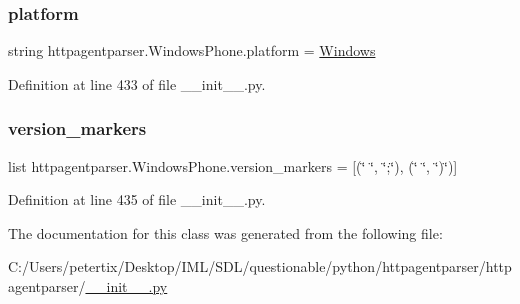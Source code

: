 \hypertarget{classhttpagentparser_1_1_windows_phone_a15ed99a57eb909ace7f81f20d6657c80}{}\label{classhttpagentparser_1_1_windows_phone_a15ed99a57eb909ace7f81f20d6657c80} 
\subsubsection{\texorpdfstring{platform}{platform}}
{\footnotesize\ttfamily string httpagentparser.\+Windows\+Phone.\+platform = \textquotesingle{}\hyperlink{classhttpagentparser_1_1_windows}{Windows}\textquotesingle{}\hspace{0.3cm}{\ttfamily [static]}}



Definition at line 433 of file \+\_\+\+\_\+init\+\_\+\+\_\+.\+py.

\hypertarget{classhttpagentparser_1_1_windows_phone_a831e0bf92f4204a06c41bac10f5269df}{}\label{classhttpagentparser_1_1_windows_phone_a831e0bf92f4204a06c41bac10f5269df} 
\subsubsection{\texorpdfstring{version\+\_\+markers}{version\_markers}}
{\footnotesize\ttfamily list httpagentparser.\+Windows\+Phone.\+version\+\_\+markers = \mbox{[}(\char`\"{} \char`\"{}, \char`\"{};\char`\"{}), (\char`\"{} \char`\"{}, \char`\"{})\char`\"{})\mbox{]}\hspace{0.3cm}{\ttfamily [static]}}



Definition at line 435 of file \+\_\+\+\_\+init\+\_\+\+\_\+.\+py.



The documentation for this class was generated from the following file\+:\begin{DoxyCompactItemize}
\item 
C\+:/\+Users/petertix/\+Desktop/\+I\+M\+L/\+S\+D\+L/questionable/python/httpagentparser/httpagentparser/\hyperlink{____init_____8py}{\+\_\+\+\_\+init\+\_\+\+\_\+.\+py}\end{DoxyCompactItemize}
